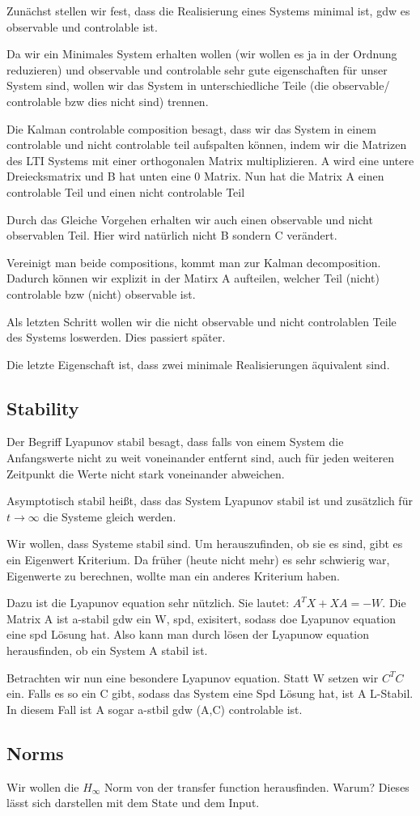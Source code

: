 \documentclass[]{article}
\begin{document}
Zunächst stellen wir fest, dass die Realisierung eines Systems minimal ist, gdw es observable und controlable ist. 

Da wir ein Minimales System erhalten wollen (wir wollen es ja in der Ordnung reduzieren) und observable und controlable sehr gute eigenschaften für unser System sind, wollen wir das System in unterschiedliche Teile (die observable/ controlable bzw dies nicht sind) trennen. 

Die Kalman controlable composition besagt, dass wir das System in einem controlable und nicht controlable teil aufspalten können, indem wir die Matrizen des LTI Systems mit einer orthogonalen Matrix multiplizieren. A wird eine untere Dreiecksmatrix und B hat unten eine 0 Matrix. Nun hat die Matrix A einen controlable Teil und einen nicht controlable Teil

Durch das Gleiche Vorgehen erhalten wir auch einen observable und nicht observablen Teil. Hier wird natürlich nicht B sondern C verändert. 

Vereinigt man beide compositions, kommt man zur Kalman decomposition. Dadurch können wir explizit in der Matirx A aufteilen, welcher Teil (nicht) controlable bzw (nicht) observable ist. 

Als letzten Schritt wollen wir die nicht observable und nicht controlablen Teile des Systems loswerden. Dies passiert später. 

Die letzte Eigenschaft ist, dass zwei minimale Realisierungen äquivalent sind. 

\subsection{Stability}
 Der Begriff Lyapunov stabil besagt, dass falls von einem System die Anfangswerte nicht zu weit voneinander entfernt sind, auch für jeden weiteren Zeitpunkt die Werte nicht stark voneinander abweichen. 
 
 Asymptotisch stabil heißt, dass das System Lyapunov stabil ist und zusätzlich für $ t \rightarrow \infty$
 die Systeme gleich werden. 
 
 Wir wollen, dass Systeme stabil sind. Um herauszufinden, ob sie es sind, gibt es ein Eigenwert Kriterium. Da früher (heute nicht mehr) es sehr schwierig war, Eigenwerte zu berechnen, wollte man ein anderes Kriterium haben.
 
 Dazu ist die Lyapunov equation sehr nützlich. Sie lautet: $A^T X + XA = -W$. Die Matrix A ist a-stabil gdw ein W, spd, exisitert, sodass doe Lyapunov equation eine spd Lösung hat. Also kann man durch lösen der Lyapunow equation herausfinden, ob ein System A stabil ist.
 
 Betrachten wir nun eine besondere Lyapunov equation. Statt W setzen wir $C^T C$ ein. Falls es so ein C gibt, sodass das System eine Spd Lösung hat, ist A L-Stabil. In diesem Fall ist A sogar a-stbil gdw (A,C) controlable ist. 
 
 \subsection{Norms}
 Wir wollen die $H_{\infty}$ Norm von der transfer function herausfinden. Warum? Dieses lässt sich darstellen mit dem State und dem Input.  
 
\end{document}
